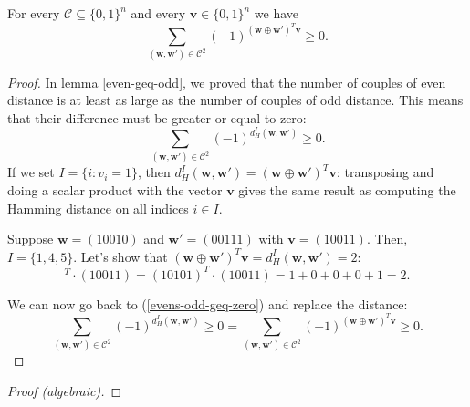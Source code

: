\begin{lemma}
    For every $\mathcal{C} \subseteq \{0,1\}^n$ and every $\mathbf{v}\in\{0,1\}^n$ we have
    \begin{equation}
        \label{sum-almost-here}
        \sum_{(\mathbf{w}, \mathbf{w}')\in\mathcal{C}^2}(-1)^{(\textbf{w} \oplus \textbf{w}')^T\mathbf{v}} \geq 0.
    \end{equation}
    \begin{proof}
        In lemma \ref{even-geq-odd}, we proved that the number of couples of even distance is at least as large as the number of couples of odd distance. This means that their difference must be greater or equal to zero:
        \begin{equation}
            \label{evens-odd-geq-zero}
            \sum_{(\mathbf{w}, \mathbf{w}')\in\mathcal{C}^2}(-1)^{d_H^I(\mathbf{w}, \mathbf{w}')} \geq 0.
        \end{equation}
        If we set $I=\{i:v_i=1\}$, then $d_H^I(\mathbf{w}, \mathbf{w}') = (\textbf{w} \oplus \textbf{w}')^T\mathbf{v}$: transposing and doing a scalar product with the vector $\mathbf{v}$ gives the same result as computing the Hamming distance on all indices $i\in I$.
        \begin{example}
            Suppose $\mathbf{w}=(10010)$ and $\mathbf{w}'=(00111)$ with $\mathbf{v}=(10011)$.
            Then, $I = \{1,4,5\}$. Let's show that $(\textbf{w} \oplus \textbf{w}')^T\mathbf{v} = d_H^I(\mathbf{w}, \mathbf{w}') = 2$:
            \begin{equation*}
                [(10010) \oplus (00111)]^T \cdot (10011) = (10101)^T \cdot (10011) = 1+0+0+0+1 = 2.
            \end{equation*}
        \end{example}
        We can now go back to (\ref{evens-odd-geq-zero}) and replace the distance:
        \begin{equation}
            \sum_{(\mathbf{w}, \mathbf{w}')\in\mathcal{C}^2}(-1)^{d_H^I(\mathbf{w}, \mathbf{w}')} \geq 0
            =
            \sum_{(\mathbf{w}, \mathbf{w}')\in\mathcal{C}^2}(-1)^{(\textbf{w} \oplus \textbf{w}')^T\mathbf{v}} \geq 0.
        \end{equation}
    \end{proof}
    \begin{proof}[Proof (algebraic)]
    \end{proof}
\end{lemma}

